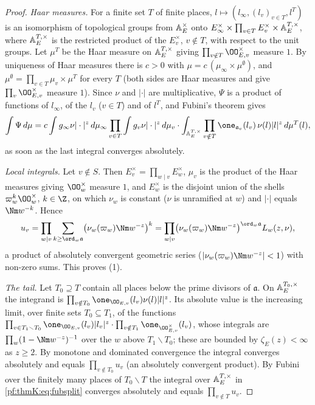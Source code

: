 \begin{proof}
\emph{Haar measures.} For a finite set $T$ of finite places, $l\mapsto(l_\infty,(l_v)_{v\in T},l^T)$ is an isomorphism of
topological groups from $\mathbb{A}_E^\times$ onto $E_\infty^\times\times\prod_{v\in T}E_v^\times\times\mathbb{A}_E^{T,\times}$,
where $\mathbb{A}_E^{T,\times}$ is the restricted product of the $E_v^\times$, $v\notin T$, with respect to the unit groups. Let
$\mu^T$ be the Haar measure on $\mathbb{A}_E^{T,\times}$ giving $\prod_{v\notin T}\OO_{E,v}^\times$ measure $1$. By uniqueness
of Haar measures there is $c>0$ with $\mu=c\,(\mu_\infty\times\mu^\emptyset)$, and $\mu^\emptyset=\prod_{v\in T}\mu_v\times
\mu^T$ for every $T$ (both sides are Haar measures and give $\prod_v\OO_{E,v}^\times$ measure $1$). Since $\nu$ and $|\cdot|$
are multiplicative, $\Psi$ is a product of functions of $l_\infty$, of the $l_v$ ($v\in T$) and of $l^T$, and Fubini's
theorem gives
\begin{equation}\label{pf:thmK:eq:fubsplit}
\int\Psi\,d\mu=c\int g_\infty\nu|\cdot|^z\,d\mu_\infty\prod_{v\in T}\int g_v\nu|\cdot|^z\,d\mu_v\cdot
\int_{\thmKAE^{T,\times}}\prod_{v\notin T}\one_{\mathfrak a_v}(l_v)\,\nu(l)|l|^z\,d\mu^T(l),
\end{equation}
as soon as the last integral converges absolutely.

\emph{Local integrals.} Let $v\notin S$. Then $E_v^\times=\prod_{w\mid v}E_w^\times$, $\mu_v$ is the product of the Haar
measures giving $\OO_w^\times$ measure $1$, and $E_w^\times$ is the disjoint union of the shells $\varpi_w^k\OO_w^\times$,
$k\in\Z$, on which $\nu_w$ is constant ($\nu$ is unramified at $w$) and $|\cdot|$ equals $\Nm w^{-k}$. Hence
\[
u_v=\prod_{w\mid v}\sum_{k\ge\ord_w\mathfrak a}\bigl(\nu_w(\varpi_w)\Nm w^{-z}\bigr)^k
=\prod_{w\mid v}\bigl(\nu_w(\varpi_w)\Nm w^{-z}\bigr)^{\ord_w\mathfrak a}L_w(z,\nu),
\]
a product of absolutely convergent geometric series ($|\nu_w(\varpi_w)\Nm w^{-z}|<1$) with non-zero sums. This proves (1).

\emph{The tail.} Let $T_0\supseteq T$ contain all places below the prime divisors of $\mathfrak a$. On
$\mathbb{A}_E^{T_0,\times}$ the integrand is $\prod_{v\notin T_0}\one_{\OO_{E,v}}(l_v)\nu(l)|l|^z$. Its absolute value is the
increasing limit, over finite sets $T_0\subseteq T_1$, of the functions $\prod_{v\in T_1\smallsetminus T_0}
\one_{\OO_{E,v}}(l_v)|l_v|^z\cdot\prod_{v\notin T_1}\one_{\OO_{E,v}^\times}(l_v)$, whose integrals are
$\prod_{w}(1-\Nm w^{-z})^{-1}$ over the $w$ above $T_1\smallsetminus T_0$; these are bounded by $\zeta_E(z)<\infty$ as
$z\ge2$. By monotone and dominated convergence the integral converges absolutely and equals $\prod_{v\notin T_0}u_v$ (an
absolutely convergent product). By Fubini over the finitely many places of $T_0\smallsetminus T$ the integral over
$\mathbb{A}_E^{T,\times}$ in \eqref{pf:thmK:eq:fubsplit} converges absolutely and equals $\prod_{v\notin T}u_v$.


\end{proof}
